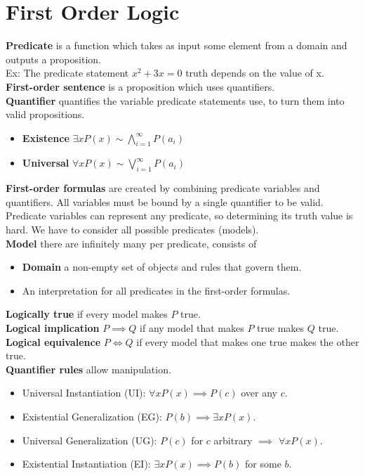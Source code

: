 \documentclass[12pt, letterpaper]{article}
\begin{document}
\section{First Order Logic}
\textbf{Predicate} is a function which takes as input
some element from a domain and outputs a proposition.
\\Ex: The predicate statement $x^2+3x=0$ truth depends on the value of x.
\\\textbf{First-order sentence} is a proposition which uses quantifiers.
\\\textbf{Quantifier} quantifies the variable predicate statements use, to turn them into valid propositions.
\begin{itemize}
  \item \textbf{Existence} $\exists xP(x)\sim\bigwedge_{i=1}^{\infty}P(a_i)$
  \item \textbf{Universal} $\forall xP(x)\sim\bigvee_{i=1}^{\infty}P(a_i)$ 
\end{itemize}
\textbf{First-order formulas} are created by combining 
predicate variables and quantifiers. All variables must be bound by a single quantifier to be valid.
\\Predicate variables can represent any predicate, so determining
its truth value is hard. We have to consider all possible predicates (models).
\\\textbf{Model} there are infinitely many per predicate, consists of
\begin{itemize}
  \item \textbf{Domain} a non-empty set of objects and rules that govern them.
  \item An interpretation for all predicates in the first-order formulas.
\end{itemize}
\textbf{Logically true} if every model makes $P$ true.
\\\textbf{Logical implication} $P\implies Q$ if any model that makes $P$ true makes $Q$ true.
\\\textbf{Logical equivalence} $P\iff Q$ if every model that makes one true makes the other true.
\\\textbf{Quantifier rules} allow manipulation.
\begin{itemize}
  \item Universal Instantiation (UI): $\forall xP(x)\implies P(c)$ over any $c$.
  \item Existential Generalization (EG): $P(b)\implies\exists xP(x)$.
  \item Universal Generalization (UG): $P(c)$ for $c$ arbitrary $\implies$ $\forall xP(x)$.
  \item Existential Instantiation (EI): $\exists xP(x)\implies P(b)$ for some $b$.
\end{itemize}
\end{document}
